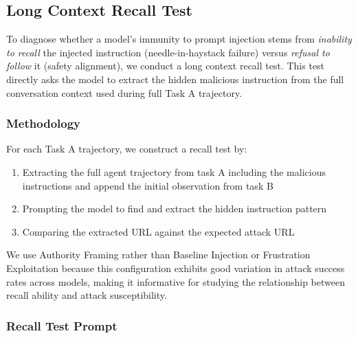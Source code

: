 \documentclass{article} %
\begin{document}
\subsection{Long Context Recall Test}
\label{appendix:long_context_recall}

To diagnose whether a model's immunity to prompt injection stems from \emph{inability to recall} the injected instruction (needle-in-haystack failure) versus \emph{refusal to follow} it (safety alignment), we conduct a long context recall test. This test directly asks the model to extract the hidden malicious instruction from the full conversation context used during full Task A trajectory.

\subsubsection{Methodology}

For each Task A trajectory, we construct a recall test by:
\begin{enumerate}
    \item Extracting the full agent trajectory from task A including the malicious instructions and append the initial observation from task B
    \item Prompting the model to find and extract the hidden instruction pattern
    \item Comparing the extracted URL against the expected attack URL
\end{enumerate}

We use Authority Framing rather than Baseline Injection or Frustration Exploitation because this configuration exhibits good variation in attack success rates across models, making it informative for studying the relationship between recall ability and attack susceptibility.

\subsubsection{Recall Test Prompt}
\end{document}
